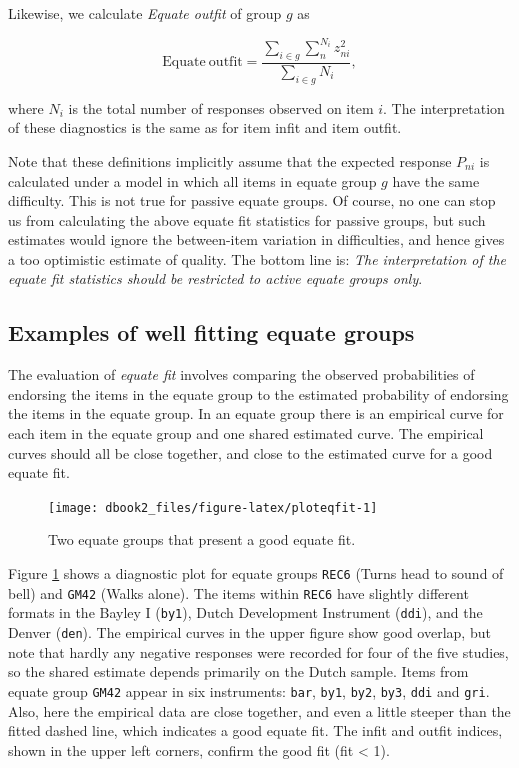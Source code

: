 \documentclass[
]{book}
\begin{document}
Likewise, we calculate \emph{Equate outfit} of group \(g\) as

\[\mathrm{Equate\ outfit} = \frac{\sum_{i\in g}\sum_{n}^{N_i} z_{ni}^2}{\sum_{i\in g} N_i},\]

where \(N_i\) is the total number of responses observed on item \(i\). The interpretation of these diagnostics is the same as for item infit and item outfit.

Note that these definitions implicitly assume that the expected response \(P_{ni}\) is calculated under a model in which all items in equate group \(g\) have the same difficulty. This is not true for passive equate groups. Of course, no one can stop us from calculating the above equate fit statistics for passive groups, but such estimates would ignore the between-item variation in difficulties, and hence gives a too optimistic estimate of quality. The bottom line is: \emph{The interpretation of the equate fit statistics should be restricted to active equate groups only}.

\hypertarget{examples-of-well-fitting-equate-groups}{%
\subsection{Examples of well fitting equate groups}\label{examples-of-well-fitting-equate-groups}}

The evaluation of \emph{equate fit} involves comparing the observed probabilities of endorsing the items in the equate group to the estimated probability of endorsing the items in the equate group. In an equate group there is an empirical curve for each item in the equate group and one shared estimated curve. The empirical curves should all be close together, and close to the estimated curve for a good equate fit.

\begin{figure}

{\centering \texttt{[image: dbook2\_files/figure-latex/ploteqfit-1]} 

}

\caption{Two equate groups that present a good equate fit.}\label{fig:ploteqfit}
\end{figure}



Figure \ref{fig:ploteqfit} shows a diagnostic plot for equate groups \texttt{REC6} (Turns head to sound of bell) and \texttt{GM42} (Walks alone). The items within \texttt{REC6} have slightly different formats in the Bayley I (\texttt{by1}), Dutch Development Instrument (\texttt{ddi}), and the Denver (\texttt{den}). The empirical curves in the upper figure show good overlap, but note that hardly any negative responses were recorded for four of the five studies, so the shared estimate depends primarily on the Dutch sample. Items from equate group \texttt{GM42} appear in six instruments: \texttt{bar}, \texttt{by1}, \texttt{by2}, \texttt{by3}, \texttt{ddi} and \texttt{gri}. Also, here the empirical data are close together, and even a little steeper than the fitted dashed line, which indicates a good equate fit. The infit and outfit indices, shown in the upper left corners, confirm the good fit (fit \textless{} 1).
\end{document}
